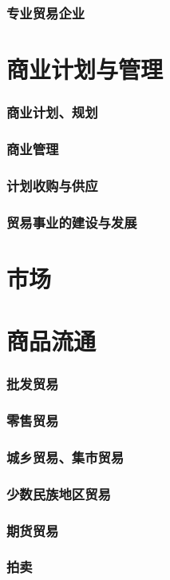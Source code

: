 \documentclass[UTF8]{../../RepresentationUniverse}
\begin{document}
    \subsubsection{专业贸易企业}
\section{商业计划与管理}
    \subsubsection{商业计划、规划}
    \subsubsection{商业管理}
    \subsubsection{计划收购与供应}
    \subsubsection{贸易事业的建设与发展}
\section{市场}
\section{商品流通}
    \subsubsection{批发贸易}
    \subsubsection{零售贸易}
    \subsubsection{城乡贸易、集市贸易}
    \subsubsection{少数民族地区贸易}
    \subsubsection{期货贸易}
    \subsubsection{拍卖}
\end{document}
